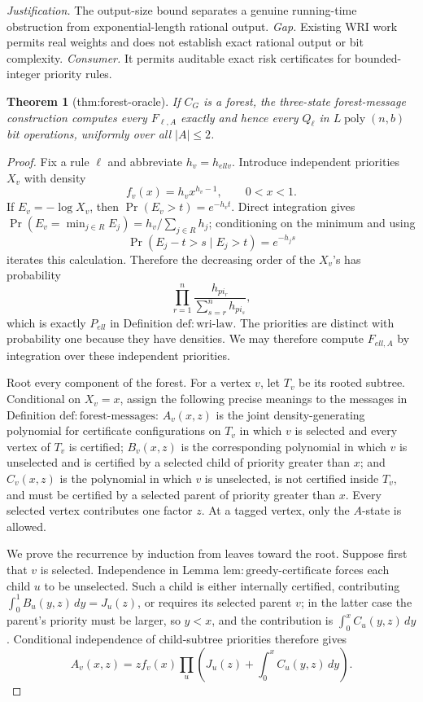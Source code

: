 \documentclass{article}
\newtheorem{theorem}{Theorem}
\begin{document}
\par\smallskip\noindent \textit{Justification.} The output-size bound separates a genuine running-time obstruction from exponential-length rational output. \textit{Gap.} Existing WRI work permits real weights and does not establish exact rational output or bit complexity. \textit{Consumer.} It permits auditable exact risk certificates for bounded-integer priority rules.

\begin{theorem}[thm:forest-oracle]\label{thm:forest-oracle}
If \(C_G\) is a forest, the three-state forest-message construction computes every \(F_{\ell,A}\) exactly and hence every \(Q_{\ell}\) in \(L\operatorname{poly}(n,b)\) bit operations, uniformly over all \(|A|\le2\).
\end{theorem}
\begin{proof}
Fix a rule \(\ell\) and abbreviate \(h_v=h_{ell v}\).  Introduce independent priorities \(X_v\) with density
\[
 f_v(x)=h_vx^{h_v-1},\qquad 0<x<1.
\]
If \(E_v=-\log X_v\), then \(\Pr(E_v>t)=e^{-h_vt}\).  Direct integration gives \(\Pr(E_v=\min_{j\in R}E_j)=h_v/\sum_{j\in R}h_j\); conditioning on the minimum and using
\[
 \Pr(E_j-t>s\mid E_j>t)=e^{-h_js}
\]
iterates this calculation.  Therefore the decreasing order of the \(X_v\)'s has probability
\[
 \prod_{r=1}^n\frac{h_{pi_r}}{\sum_{s=r}^nh_{pi_s}},
\]
which is exactly \(P_{ell}\) in Definition \(\mathrm{def:wri\mbox{-}law}\).  The priorities are distinct with probability one because they have densities.  We may therefore compute \(F_{ell,A}\) by integration over these independent priorities.

Root every component of the forest.  For a vertex \(v\), let \(T_v\) be its rooted subtree.  Conditional on \(X_v=x\), assign the following precise meanings to the messages in Definition \(\mathrm{def:forest\mbox{-}messages}\): \(A_v(x,z)\) is the joint density-generating polynomial for certificate configurations on \(T_v\) in which \(v\) is selected and every vertex of \(T_v\) is certified; \(B_v(x,z)\) is the corresponding polynomial in which \(v\) is unselected and is certified by a selected child of priority greater than \(x\); and \(C_v(x,z)\) is the polynomial in which \(v\) is unselected, is not certified inside \(T_v\), and must be certified by a selected parent of priority greater than \(x\).  Every selected vertex contributes one factor \(z\).  At a tagged vertex, only the \(A\)-state is allowed.

We prove the recurrence by induction from leaves toward the root.  Suppose first that \(v\) is selected.  Independence in Lemma \(\mathrm{lem:greedy\mbox{-}certificate}\) forces each child \(u\) to be unselected.  Such a child is either internally certified, contributing \(\int_0^1B_u(y,z)\,dy=J_u(z)\), or requires its selected parent \(v\); in the latter case the parent's priority must be larger, so \(y<x\), and the contribution is \(\int_0^xC_u(y,z)\,dy\).  Conditional independence of child-subtree priorities therefore gives
\[
 A_v(x,z)=zf_v(x)\prod_u\left(J_u(z)+\int_0^xC_u(y,z)\,dy\right).
\]


\end{proof}
\end{document}
